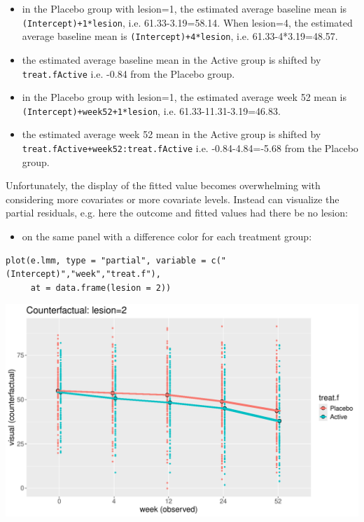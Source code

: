 \documentclass[12pt]{article}
\begin{document}
\begin{itemize}
\item in the Placebo group with lesion=1, the estimated average baseline mean
is \texttt{(Intercept)+1*lesion}, i.e. 61.33-3.19=58.14. When lesion=4, the
estimated average baseline mean is \texttt{(Intercept)+4*lesion},
i.e. 61.33-4*3.19=48.57.
\item the estimated average baseline mean in the Active group is shifted
by \texttt{treat.fActive} i.e. -0.84 from the Placebo group.
\item in the Placebo group with lesion=1, the estimated average week 52
mean is \newline \texttt{(Intercept)+week52+1*lesion},
i.e. 61.33-11.31-3.19=46.83.
\item the estimated average week 52 mean in the Active group is shifted by \newline
\texttt{treat.fActive+week52:treat.fActive} i.e. -0.84-4.84=-5.68 from the
Placebo group.
\end{itemize}

Unfortunately, the display of the fitted value becomes overwhelming
with considering more covariates or more covariate levels. Instead can
visualize the partial residuals, e.g. here the outcome and fitted
values had there be no lesion:
\begin{itemize}
\item on the same panel with a difference color for each treatment group:
\end{itemize}
\lstset{language=r,label= ,caption= ,captionpos=b,numbers=none}
\begin{lstlisting}
plot(e.lmm, type = "partial", variable = c("(Intercept)","week","treat.f"),
     at = data.frame(lesion = 2))
\end{lstlisting}

\begin{center}
\includegraphics[trim={0 0 0 0},width=.8\textwidth]{./figures/gg-lmm-presTraj.pdf}
\end{center}
\end{document}
